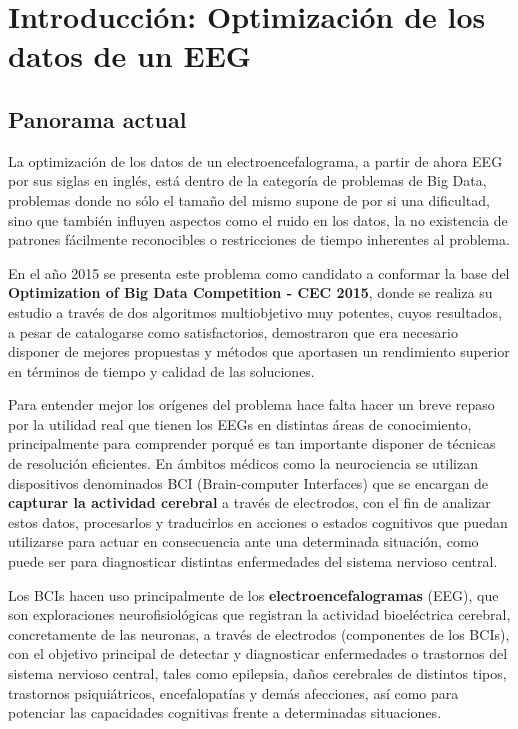 \chapter{Introducción: Optimización de los datos de un EEG}\label{cap:QEEG}

\section{Panorama actual}

La optimización de los datos de un electroencefalograma, a partir de ahora EEG por sus siglas en inglés, está dentro de la categoría de problemas de Big Data, problemas donde no sólo el tamaño del mismo supone de por si una dificultad, sino que también influyen aspectos como el ruido en los datos, la no existencia de patrones fácilmente reconocibles o restricciones de tiempo inherentes al problema.

En el año 2015 se presenta este problema como candidato a conformar la base del \textbf{Optimization of Big Data Competition - CEC 2015}\cite{EvolutionaryBigOpt}, donde se realiza su estudio a través de dos algoritmos multiobjetivo muy potentes, cuyos resultados, a pesar de catalogarse como satisfactorios, demostraron que era necesario disponer de mejores propuestas y métodos que aportasen un rendimiento superior en términos de tiempo y calidad de las soluciones.

Para entender mejor los orígenes del problema hace falta hacer un breve repaso por la utilidad real que tienen los EEGs en distintas áreas de conocimiento, principalmente para comprender porqué es tan importante disponer de técnicas de resolución eficientes. En ámbitos médicos como la neurociencia se utilizan dispositivos denominados BCI (Brain-computer Interfaces)\cite{BCI} que se encargan de \textbf{capturar la actividad cerebral} a través de electrodos, con el fin de analizar estos datos, procesarlos y traducirlos en acciones o estados cognitivos que puedan utilizarse para actuar en consecuencia ante una determinada situación, como puede ser para diagnosticar distintas enfermedades del sistema nervioso central.

Los BCIs hacen uso principalmente de los \textbf{electroencefalogramas} (EEG), que son exploraciones neurofisiológicas que registran la actividad bioeléctrica cerebral, concretamente de las neuronas, a través de electrodos (componentes de los BCIs), con el objetivo principal de detectar y diagnosticar enfermedades o trastornos del sistema nervioso central\cite{EEG}, tales como epilepsia, daños cerebrales de distintos tipos, trastornos psiquiátricos, encefalopatías y demás afecciones\cite{EEG2}, así como para potenciar las capacidades cognitivas frente a determinadas situaciones\cite{ICA-EGG}.

